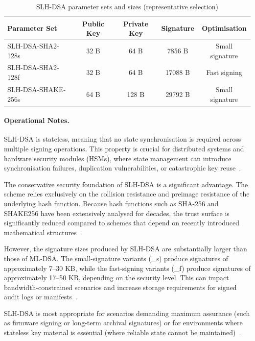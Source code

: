\documentclass[12pt,a4paper]{article}
\begin{document}
\begin{table}[htbp]
\centering
\caption{SLH-DSA parameter sets and sizes (representative selection)}
\label{tab:slhdsa-params}
\begin{tabular}{lcccc}
\toprule
\textbf{Parameter Set} & \textbf{Public Key} & \textbf{Private Key} & \textbf{Signature} & \textbf{Optimisation} \\
\midrule
SLH-DSA-SHA2-128s  & 32 B & 64 B & 7856 B  & Small signature \\
SLH-DSA-SHA2-128f  & 32 B & 64 B & 17088 B & Fast signing \\
SLH-DSA-SHAKE-256s & 64 B & 128 B & 29792 B & Small signature \\
\bottomrule
\end{tabular}
\end{table}

\paragraph{Operational Notes.}
SLH-DSA is stateless, meaning that no state synchronisation is required across multiple signing operations. This property is crucial for distributed systems and hardware security modules (HSMs), where state management can introduce synchronisation failures, duplication vulnerabilities, or catastrophic key reuse~\cite{nist-fips-205-2024,nist-sp800-208-2020}.

The conservative security foundation of SLH-DSA is a significant advantage. The scheme relies exclusively on the collision resistance and preimage resistance of the underlying hash function. Because hash functions such as SHA-256 and SHAKE256 have been extensively analysed for decades, the trust surface is significantly reduced compared to schemes that depend on recently introduced mathematical structures~\cite{nist-fips-205-2024}.

However, the signature sizes produced by SLH-DSA are substantially larger than those of ML-DSA. The small-signature variants (\_s) produce signatures of approximately 7–30 KB, while the fast-signing variants (\_f) produce signatures of approximately 17–50 KB, depending on the security level. This can impact bandwidth-constrained scenarios and increase storage requirements for signed audit logs or manifests~\cite{nist-fips-205-2024}.

SLH-DSA is most appropriate for scenarios demanding maximum assurance (such as firmware signing or long-term archival signatures) or for environments where stateless key material is essential (where reliable state cannot be maintained)~\cite{nist-fips-205-2024}.
\end{document}
